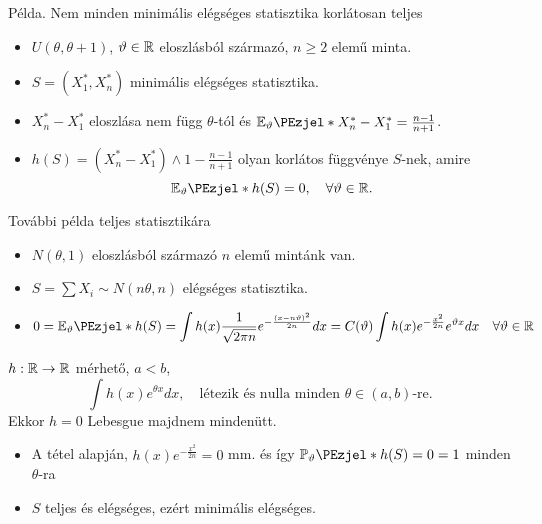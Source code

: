 \documentclass[aspectratio=169,notheorems,9pt,\option]{beamer}
\begin{document}
  
  \begin{frame}{Példa. Nem minden minimális elégséges statisztika korlátosan teljes}
    \begin{itemize}
      \item $U(\theta,\theta+1)$, $\vartheta\in\mathbb{R}$ eloszlásból származó, $n\geq2$ elemű minta.
      \item $S=(X_1^*,X_n^*)$ minimális elégséges statisztika.
      \item $X_n^*-X_1^*$ eloszlása nem függ $\theta$-tól és $\E[\theta]{X_n^*-X_1^*}=\frac{n-1}{n+1}$.
      \item $h(S)=(X_n^*-X_1^*)\wedge1-\frac{n-1}{n+1}$ olyan korlátos függvénye $S$-nek, amire
      \begin{displaymath}
        \E[\theta]{h(S)}=0,\quad\forall \theta\in\real.
      \end{displaymath}
    \end{itemize}
  \end{frame}
  
  \begin{frame}{További példa teljes statisztikára}
    \begin{itemize}
      \item $N(\theta,1)$ eloszlásból származó $n$ elemű mintánk van.
      \item $S=\sum X_i\sim N(n\theta,n)$ elégséges statisztika.
      \item 
      \begin{displaymath}
        0=\E[\theta]{h(S)}=\int h(x)\frac{1}{\sqrt{2\pi n}} e^{-\frac{(x-n\theta)^2}{2n}}d x 
        =C(\theta)\int h(x)e^{-\frac{x^2}{2n}}e^{\theta x}d x\quad\forall\theta\in\real  
      \end{displaymath} 
    \end{itemize}
    \begin{theorem}
      $h:\mathbb{R}\to\mathbb{R}$ mérhető, $a<b$, 
      \begin{displaymath}
        \int h(x)e^{\theta x} d x,\quad\text{létezik és nulla minden $\theta\in(a,b)$-re}.
      \end{displaymath} 
      Ekkor $h=0$ Lebesgue majdnem mindenütt.
    \end{theorem}
    \begin{itemize}
      \item A tétel alapján, $h(x)e^{-\frac{x^2}{2n}}=0$ mm. és így $\P[\theta]{h(S)=0}=1$ minden $\theta$-ra
      \item $S$ teljes és elégséges, ezért minimális elégséges.
    \end{itemize}
  \end{frame}
  
\end{document}

